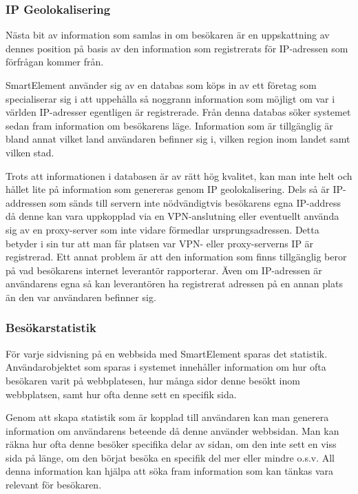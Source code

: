 \subsubsection{IP Geolokalisering}


Nästa bit av information som samlas in om besökaren är en uppskattning av dennes position på basis av den information som registrerats för IP-adressen som förfrågan kommer från.

SmartElement använder sig av en databas som köps in av ett företag som specialiserar sig i att uppehålla så noggrann information som möjligt om var i världen IP-adresser egentligen är registrerade. Från denna databas söker systemet sedan fram information om besökarens läge. Information som är tillgänglig är bland annat vilket land användaren befinner sig i, vilken region inom landet samt vilken stad.

Trots att informationen i databasen är av rätt hög kvalitet, kan man inte helt och hållet lite på information som genereras genom IP geolokalisering. Dels så är IP-addressen som sänds till servern inte nödvändigtvis besökarens egna IP-address då denne kan vara uppkopplad via en VPN-anslutning eller eventuellt använda sig av en proxy-server som inte vidare förmedlar ursprungsadressen. Detta betyder i sin tur att man får platsen var VPN- eller proxy-serverns IP är registrerad. Ett annat problem är att den information som finns tillgänglig beror på vad besökarens internet leverantör rapporterar. Även om IP-adressen är användarens egna så kan leverantören ha registrerat adressen på en annan plats än den var användaren befinner sig. 

\subsubsection{Besökarstatistik}

För varje sidvisning på en webbsida med SmartElement sparas det statistik. Användarobjektet som sparas i systemet innehåller information om hur ofta besökaren varit på webbplatesen, hur många sidor denne besökt inom webbplatsen, samt hur ofta denne sett en specifik sida.

Genom att skapa statistik som är kopplad till användaren kan man generera information om användarens beteende då denne använder webbsidan. Man kan räkna hur ofta denne besöker specifika delar av sidan, om den inte sett en viss sida på länge, om den börjat besöka en specifik del mer eller mindre o.s.v. All denna information kan hjälpa att söka fram information som kan tänkas vara relevant för besökaren.

